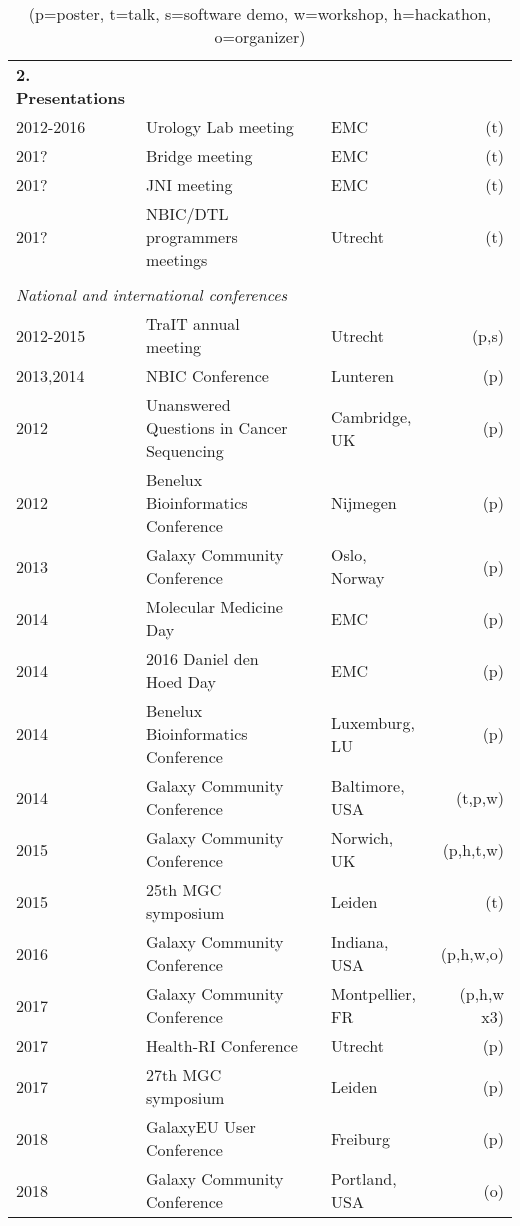 \begin{table}
    \begin{tabular}{llp{1.4cm}lr}
        \textbf{2. Presentations} \\
        2012-2016 & Urology Lab meeting              && EMC         & (t) \\
        201?      & Bridge meeting                   && EMC         & (t) \\
        201?      & JNI meeting                      && EMC         & (t) \\
        201?      & NBIC/DTL programmers meetings    && Utrecht     & (t) \\
        \\
        \multicolumn{4}{l}{\textit{National and international conferences}} \\
        2012-2015 & TraIT annual meeting                   && Utrecht         & (p,s) \\
        2013,2014 & NBIC Conference                        && Lunteren        & (p) \\
        2012 & Unanswered Questions in Cancer Sequencing   && Cambridge, UK   & (p) \\
        2012 & Benelux Bioinformatics Conference           && Nijmegen        & (p) \\
        2013 & Galaxy Community Conference                 && Oslo, Norway    & (p) \\
        2014 & Molecular Medicine Day                      && EMC             & (p) \\
        2014 & 2016 Daniel den Hoed Day                    && EMC             & (p) \\
        2014 & Benelux Bioinformatics Conference           && Luxemburg, LU   & (p) \\
        2014 & Galaxy Community Conference                 && Baltimore, USA  & (t,p,w) \\
        2015 & Galaxy Community Conference                 && Norwich, UK     & (p,h,t,w) \\
        2015 & 25th MGC symposium                          && Leiden          & (t) \\
        2016 & Galaxy Community Conference                 && Indiana, USA    & (p,h,w,o) \\
        2017 & Galaxy Community Conference                 && Montpellier, FR & (p,h,w x3) \\
        2017 & Health-RI Conference                        && Utrecht         & (p) \\
        2017 & 27th MGC symposium                          && Leiden          & (p) \\
        2018 & GalaxyEU User Conference                    && Freiburg        & (p) \\
        2018 & Galaxy Community Conference                 && Portland, USA   & (o) \\
    \end{tabular}
    \caption*{(p=poster, t=talk, s=software demo, w=workshop, h=hackathon, o=organizer)}
\end{table}


